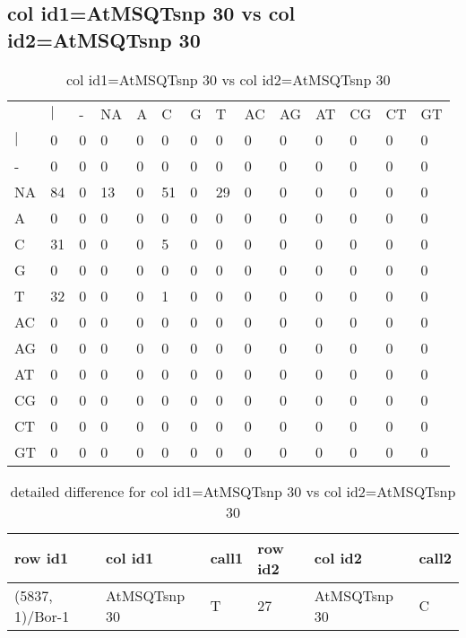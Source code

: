 \subsection{col id1=AtMSQTsnp 30 vs col id2=AtMSQTsnp 30}
\begin{center}
\begin{longtable}{|l|l|l|l|l|l|l|l|l|l|l|l|l|l|}
\caption{col id1=AtMSQTsnp 30 vs col id2=AtMSQTsnp 30} \label{table_dm644}\\
\hline
\\
\hline
&$|$&-&NA&A&C&G&T&AC&AG&AT&CG&CT&GT\\
$|$&0&0&0&0&0&0&0&0&0&0&0&0&0\\
-&0&0&0&0&0&0&0&0&0&0&0&0&0\\
NA&84&0&13&0&51&0&29&0&0&0&0&0&0\\
A&0&0&0&0&0&0&0&0&0&0&0&0&0\\
C&31&0&0&0&5&0&0&0&0&0&0&0&0\\
G&0&0&0&0&0&0&0&0&0&0&0&0&0\\
T&32&0&0&0&1&0&0&0&0&0&0&0&0\\
AC&0&0&0&0&0&0&0&0&0&0&0&0&0\\
AG&0&0&0&0&0&0&0&0&0&0&0&0&0\\
AT&0&0&0&0&0&0&0&0&0&0&0&0&0\\
CG&0&0&0&0&0&0&0&0&0&0&0&0&0\\
CT&0&0&0&0&0&0&0&0&0&0&0&0&0\\
GT&0&0&0&0&0&0&0&0&0&0&0&0&0\\
\hline
\end{longtable}
\end{center}

\begin{center}
\begin{longtable}{|l|l|l|l|l|l|}
\caption{detailed difference for col id1=AtMSQTsnp 30 vs col id2=AtMSQTsnp 30} \label{table_dm645}\\
\hline
row id1&col id1&call1&row id2&col id2&call2\\
\hline
(5837, 1)/Bor-1&AtMSQTsnp 30&T&27&AtMSQTsnp 30&C\\
\hline
\end{longtable}
\end{center}


